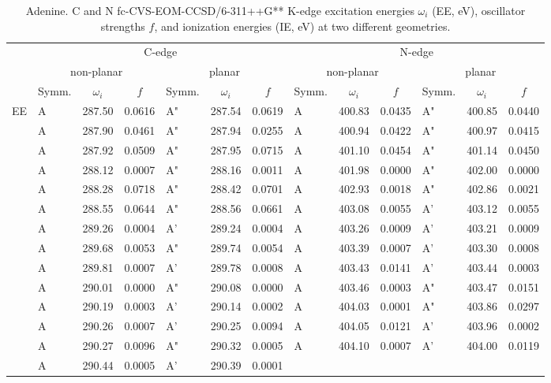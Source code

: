 \documentclass[journal=jctcce,manuscript=article]{achemso}
\begin{document}
\begin{table}
\caption{Adenine.  C and N fc-CVS-EOM-CCSD/6-311++G** K-edge excitation energies $\omega_i$ (EE, eV), oscillator strengths $f$, and ionization energies (IE, eV) at two different geometries.
\label{Tab:Adenine}}
\scriptsize
\begin{tabular}{l|lcc|lcc||lcc|lcc}
\cline{2-13}
& \multicolumn{6}{c||}{C-edge}
& \multicolumn{6}{c}{N-edge}\\\cline{2-7}\cline{8-13}
& \multicolumn{3}{c|}{non-planar}
& \multicolumn{3}{c||}{planar}  
& \multicolumn{3}{c|}{non-planar}
& \multicolumn{3}{c}{planar} \\
\cline{2-13}
& Symm. & $\omega_i$ & $f$ 
& Symm. & $\omega_i$ & $f$ 
& Symm. & $\omega_i$ & $f$ 
& Symm. & $\omega_i$ & $f$\\
\hline
  EE 
& A & 287.50 & 0.0616	& A" & 287.54 & 0.0619   
& A & 400.83 & 0.0435	& A" & 400.85 & 0.0440 \\
& A & 287.90 & 0.0461	& A" & 287.94 & 0.0255 
& A & 400.94 & 0.0422	& A" & 400.97 & 0.0415 \\
& A & 287.92 & 0.0509	& A" & 287.95 & 0.0715  
& A & 401.10 & 0.0454	& A" & 401.14 & 0.0450 \\
& A & 288.12 & 0.0007	& A" & 288.16 & 0.0011  
& A & 401.98 & 0.0000	& A" & 402.00 & 0.0000 \\
& A & 288.28 & 0.0718	& A" & 288.42 & 0.0701 
& A & 402.93 & 0.0018	& A" & 402.86 & 0.0021 \\
& A & 288.55 & 0.0644	& A" & 288.56 & 0.0661  
& A & 403.08 & 0.0055	& A' & 403.12 & 0.0055 \\
& A & 289.26 & 0.0004	& A' & 289.24 & 0.0004  
& A & 403.26 & 0.0009	& A' & 403.21 & 0.0009 \\
& A & 289.68 & 0.0053	& A" & 289.74 & 0.0054  
& A & 403.39 & 0.0007	& A' & 403.30 & 0.0008 \\
& A & 289.81 & 0.0007	& A' & 289.78 & 0.0008  
& A & 403.43 & 0.0141	& A' & 403.44 & 0.0003 \\
& A & 290.01 & 0.0000	& A" & 290.08 & 0.0000  
& A & 403.46 & 0.0003	& A" & 403.47 & 0.0151 \\
& A & 290.19 & 0.0003	& A' & 290.14 & 0.0002  
& A & 404.03 & 0.0001	& A" & 403.86 & 0.0297 \\
& A & 290.26 & 0.0007	& A' & 290.25 & 0.0094  
& A & 404.05 & 0.0121	& A' & 403.96 & 0.0002 \\
& A & 290.27 & 0.0096	& A" & 290.32 & 0.0005  
& A & 404.10 & 0.0007	& A' & 404.00 & 0.0119 \\
& A & 290.44 & 0.0005	& A' & 290.39 & 0.0001  

\end{tabular}
\end{table}
\end{document}

